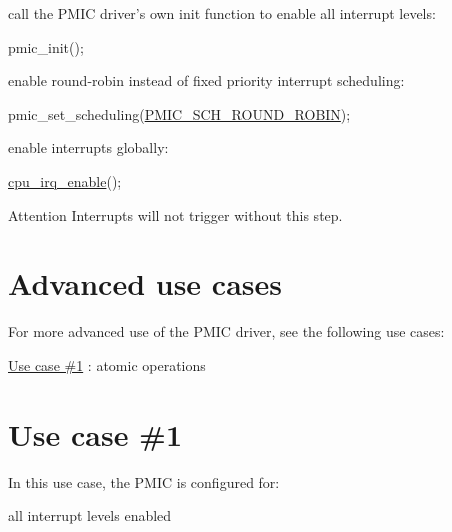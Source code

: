 \begin{DoxyEnumerate}
\item call the P\-M\-I\-C driver's own init function to enable all interrupt levels\-:
\begin{DoxyItemize}
\item 
\begin{DoxyCode}
 pmic\_init(); 
\end{DoxyCode}

\end{DoxyItemize}
\item enable round-\/robin instead of fixed priority interrupt scheduling\-:
\begin{DoxyItemize}
\item 
\begin{DoxyCode}
 pmic\_set\_scheduling(\hyperlink{group__pmic__group_gga68099717e4fa4e95f12943d3e3e55d79a29065590de0ddf49e19afb6de1646c79}{PMIC\_SCH\_ROUND\_ROBIN}); 
\end{DoxyCode}

\end{DoxyItemize}
\item enable interrupts globally\-:
\begin{DoxyItemize}
\item 
\begin{DoxyCode}
 \hyperlink{group__interrupt__group_gae4922a4bd8ba4150211fbc7f2302403c}{cpu\_irq\_enable}(); 
\end{DoxyCode}

\item \begin{DoxyAttention}{Attention}
Interrupts will not trigger without this step.
\end{DoxyAttention}

\end{DoxyItemize}
\end{DoxyEnumerate}\hypertarget{xmega_pmic_quickstart_pmic_use_cases}{}\section{Advanced use cases}\label{xmega_pmic_quickstart_pmic_use_cases}
For more advanced use of the P\-M\-I\-C driver, see the following use cases\-:
\begin{DoxyItemize}
\item \hyperlink{pmic_use_case_1}{Use case \#1} \-: atomic operations 
\end{DoxyItemize}\hypertarget{pmic_use_case_1}{}\section{Use case \#1}\label{pmic_use_case_1}
In this use case, the P\-M\-I\-C is configured for\-:
\begin{DoxyItemize}
\item all interrupt levels enabled
\end{DoxyItemize}

